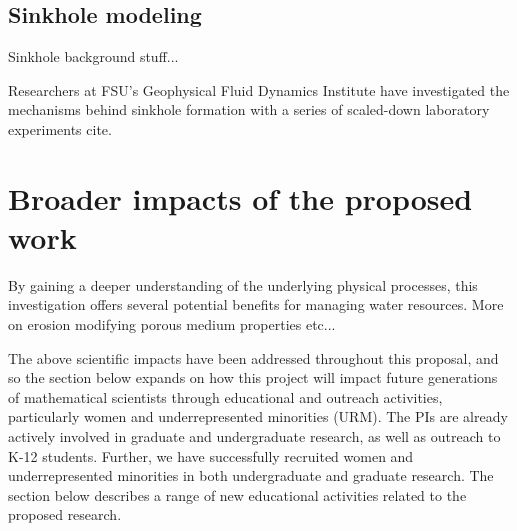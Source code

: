 \documentclass[11pt]{article}
\newcommand{\nick}[1]{{\color{red}#1}}
\newcommand{\np}{\newpage \noindent}
\begin{document}
\subsection{Sinkhole modeling}

Sinkhole background stuff...

Researchers at FSU's Geophysical Fluid Dynamics Institute have investigated the mechanisms behind sinkhole formation with a series of scaled-down laboratory experiments {\color{blue} cite}.





\np



\section{Broader impacts of the proposed work}

By gaining a deeper understanding of the underlying physical processes, this investigation offers several potential benefits for managing water resources.
\nick{More on erosion modifying porous medium properties etc...}

The above scientific impacts have been addressed throughout this proposal, and so the section below expands on how this project will impact future generations of mathematical scientists through educational and outreach activities, particularly women and underrepresented minorities (URM). 
The PIs are already actively involved in graduate and undergraduate research, as well as outreach to K-12 students. Further, we have successfully recruited women and underrepresented minorities in both undergraduate and graduate research. The section below describes a range of new educational activities related to the proposed research.
\end{document}
